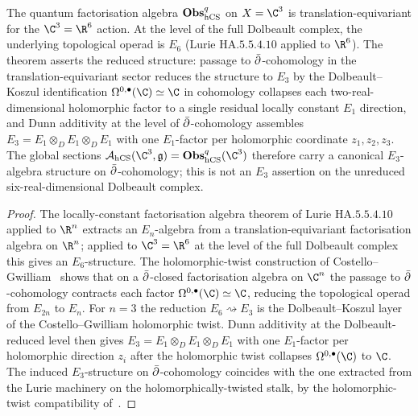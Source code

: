 \begin{theorem}
\label{thm:hcs-e3-from-translation}
%
The quantum factorisation algebra $\mathbf{Obs}^{q}_{\mathrm{hCS}}$ on $X = \C^3$ is
translation-equivariant for the $\C^3 = \R^6$ action. At the level of
the full Dolbeault complex, the underlying topological operad is
$E_6$ (Lurie $\mathrm{HA}.5.5.4.10$ applied to $\R^6$). The theorem
asserts the reduced structure: passage to $\bar\partial$-cohomology in the
translation-equivariant sector reduces the structure to $E_3$ by the
Dolbeault--Koszul identification
$\Omega^{0,\bullet}(\C)\simeq\C$ in cohomology collapses each
two-real-dimensional holomorphic factor to a single residual
locally constant $E_1$ direction, and Dunn additivity at the level of
$\bar\partial$-cohomology assembles
$E_3 = E_1\otimes_D E_1\otimes_D E_1$ with one $E_1$-factor per
holomorphic coordinate $z_1,z_2,z_3$. The global sections
$\cA_{\hCS}(\C^3,\fg)=\Fobs^q_{\hCS}(\C^3)$ therefore carry a
canonical $E_3$-algebra structure on $\bar\partial$-cohomology; this is not
an $E_3$ assertion on the unreduced six-real-dimensional Dolbeault
complex.
\end{theorem}

\begin{proof}
The locally-constant factorisation algebra theorem of Lurie
$\mathrm{HA}.5.5.4.10$ applied to $\R^n$ extracts an $E_n$-algebra
from a translation-equivariant factorisation algebra on $\R^n$;
applied to $\C^3=\R^6$ at the level of the full Dolbeault complex
this gives an $E_6$-structure. The holomorphic-twist construction of
Costello--Gwilliam~\cite[\S5.2.1, Ch.\,5, Thm.\,5.1]{CostelloGwilliam2017}
shows that on a $\bar\partial$-closed factorisation algebra on $\C^n$ the
passage to $\bar\partial$-cohomology contracts each factor
$\Omega^{0,\bullet}(\C)\simeq\C$, reducing the topological operad
from $E_{2n}$ to $E_n$. For $n=3$ the reduction $E_6\rightsquigarrow E_3$
is the Dolbeault--Koszul layer of the Costello--Gwilliam holomorphic
twist. Dunn additivity at the Dolbeault-reduced level then gives
$E_3 = E_1\otimes_D E_1\otimes_D E_1$ with one $E_1$-factor per
holomorphic direction $z_i$ after the holomorphic twist collapses
$\Omega^{0,\bullet}(\C)$ to $\C$. The induced $E_3$-structure
on $\bar\partial$-cohomology coincides with the one extracted from the
Lurie machinery on the holomorphically-twisted stalk, by the
holomorphic-twist compatibility
of~\cite[\S5.2.1, Ch.\,5]{CostelloGwilliam2017}.
\end{proof}

